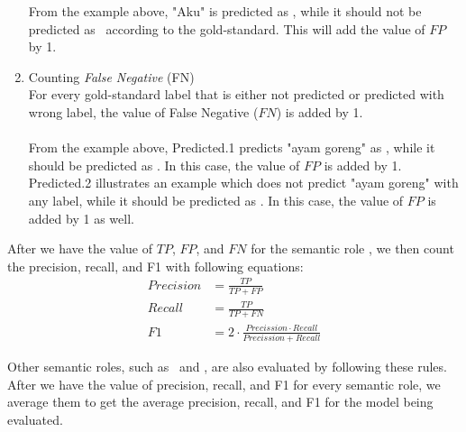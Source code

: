 \begin{enumerate}
	From the example above, "Aku" is predicted as \patient, while it should not be predicted as \patient~according to the gold-standard. This will add the value of $FP$ by 1.
	\\
	
	\item Counting \textit{False Negative} (FN)\\
	For every gold-standard label that is either not predicted or predicted with wrong label, the value of False Negative ($FN$) is added by 1.
	\\
	
	\\
	
	From the example above, Predicted.1 predicts "ayam goreng" as \agent, while it should be predicted as \patient. In this case, the value of $FP$ is added by 1. Predicted.2 illustrates an example which does not predict "ayam goreng" with any label, while it should be predicted as \patient. In this case, the value of $FP$ is added by 1 as well.
	
\end{enumerate}

After we have the value of $TP$, $FP$, and $FN$ for the semantic role \patient, we then count the precision, recall, and F1 with following equations:
\begin{align}
Precision &= \frac{TP}{TP+FP}\\
Recall &= \frac{TP}{TP+FN}\\
F1 &= 2 \cdot \frac{Precission \cdot Recall}{Precission + Recall}
\end{align}

Other semantic roles, such as \agent~and \beneficiary, are also evaluated by following these rules. After we have the value of precision, recall, and F1 for every semantic role, we average them to get the average precision, recall, and F1 for the model being evaluated.
	